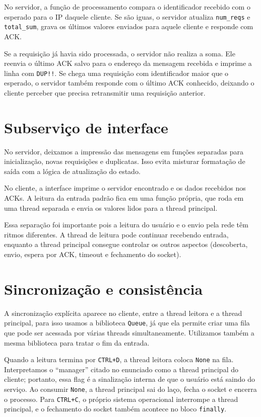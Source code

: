 \documentclass[12pt,a4paper]{article}
\begin{document}
No servidor, a função de processamento compara o identificador recebido com o esperado para o IP daquele cliente. Se são iguas, o
servidor atualiza \texttt{num\_reqs} e \texttt{total\_sum}, grava os
últimos valores enviados para aquele cliente e responde com ACK.

Se a requisição já havia sido processada, o servidor não realiza a soma. Ele
reenvia o último ACK salvo para o endereço da mensagem recebida e imprime a linha com \texttt{DUP!!}.
Se chega uma requisição com identificador maior que o esperado, o servidor também
responde com o último ACK conhecido, deixando o cliente perceber que precisa
retransmitir uma requisição anterior.

\section*{Subserviço de interface}

No servidor, deixamos a impressão das mensagens em funções separadas para
inicialização, novas requisições e duplicatas. Isso evita misturar formatação de
saída com a lógica de atualização do estado.

No cliente, a interface imprime o servidor encontrado e os dados recebidos nos
ACKs. A leitura da entrada padrão fica em uma função própria, que roda em uma
thread separada e envia os valores lidos para a thread principal.

Essa separação foi importante pois a leitura do usuário e o envio pela rede têm
ritmos diferentes. A thread de leitura pode continuar recebendo entrada, enquanto a
thread principal consegue controlar os outros aspectos (descoberta, envio, espera por ACK, timeout e fechamento
do socket).

\section*{Sincronização e consistência}

A sincronização explícita aparece no cliente, entre a thread leitora e a thread
principal, para isso usamos a biblioteca \texttt{Queue}, já que ela permite criar uma fila que pode ser acessada por várias threads simultaneamente. Utilizamos também a mesma biblioteca para tratar o fim da entrada.

 Quando a leitura termina por
\texttt{CTRL+D}, a thread leitora coloca \texttt{None} na fila. Interpretamos o
``manager'' citado no enunciado como a thread principal do cliente; portanto, essa
flag é a sinalização interna de que o usuário está saindo do serviço. Ao consumir
\texttt{None}, a thread principal sai do laço, fecha o socket e encerra o processo.
Para \texttt{CTRL+C}, o próprio sistema operacional interrompe a thread principal,
e o fechamento do socket também acontece no bloco \texttt{finally}.
\end{document}
